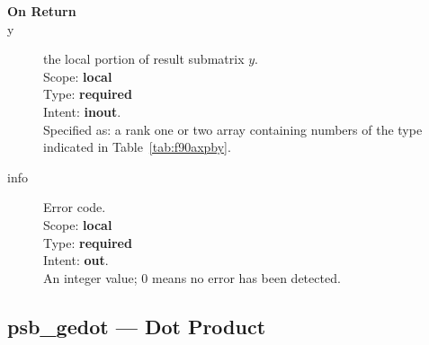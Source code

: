 \begin{description}

\end{description}

\begin{description}
\item[\bf On Return]
\item[y] the local portion of result submatrix $y$.\\
Scope: {\bf local} \\
Type: {\bf required} \\
Intent: {\bf inout}.\\
Specified as: a rank one or two array containing numbers of the type
indicated in Table~\ref{tab:f90axpby}.
\item[info] Error code.\\
Scope: {\bf local} \\
Type: {\bf required} \\
Intent: {\bf out}.\\
An integer value; 0 means no error has been detected. 
\end{description}


%
%

\clearpage\subsection*{psb\_gedot --- Dot Product}


